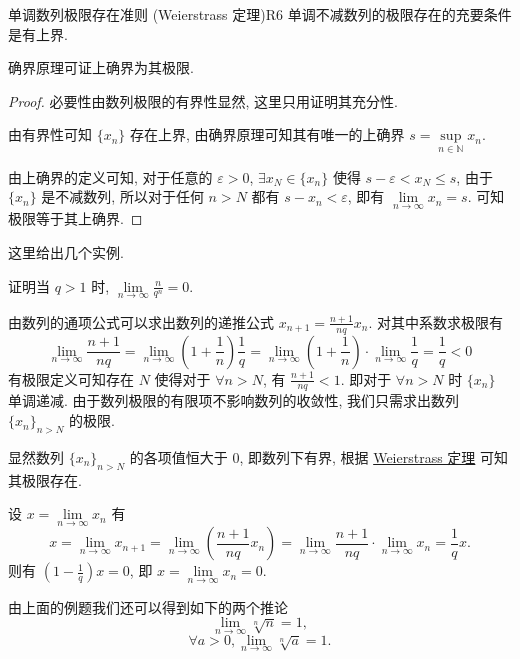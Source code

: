 \documentclass[cn,toc=twocol]{elegantbook}
\newcommand{\N}{\mathbb{N}}
\begin{document}
\begin{theorem}{单调数列极限存在准则 (Weierstrass 定理)}{R6}
单调不减数列的极限存在的充要条件是有上界.	
\end{theorem}

\begin{idea*}
	确界原理可证上确界为其极限.
\end{idea*}

\begin{proof}
	必要性由数列极限的有界性显然, 这里只用证明其充分性.
	
	由有界性可知 $\{x_n\}$ 存在上界, 由确界原理可知其有唯一的上确界 $s = \sup\limits_{n\in\N} x_n$.
	
	由上确界的定义可知, 对于任意的 $\varepsilon > 0$, $\exists x_N \in \{x_n\}$ 使得 $s - \varepsilon < x_N \le s$, 由于 $\{x_n\}$ 是不减数列, 所以对于任何 $n > N$ 都有 $s - x_n < \varepsilon$, 即有 $\lim\limits_{n \to \infty} x_n = s$. 可知极限等于其上确界.
\end{proof}
\smallskip

这里给出几个实例.

\begin{example}
	证明当 $q > 1$ 时, $\lim\limits_{n \to \infty} \frac{n}{q^n} = 0$. 
\end{example}

\begin{solution}
	由数列的通项公式可以求出数列的递推公式 $x_{n+1} = \frac{n+1}{nq} x_n$. 对其中系数求极限有
	\[
		\lim_{n \to \infty} \frac{n+1}{nq} = \lim_{n\to \infty} \left(1 + \frac{1}{n}\right)\frac{1}{q} = \lim_{n\to \infty} \left(1 + \frac{1}{n}\right) \cdot \lim_{n\to \infty} \frac{1}{q} = \frac{1}{q} < 0
	\]
	有极限定义可知存在 $N$ 使得对于 $\forall n > N$, 有 $\frac{n+1}{nq} < 1$. 即对于 $\forall n > N$ 时 $\{x_n\}$ 单调递减. 由于数列极限的有限项不影响数列的收敛性, 我们只需求出数列 $\{x_n\}_{n > N}$ 的极限.
	
	显然数列 $\{ x_n \}_{n > N}$ 的各项值恒大于 $0$, 即数列下有界, 根据 \hyperref[thm:R6]{Weierstrass 定理} 可知其极限存在.
	
	设 $x = \lim\limits_{n \to \infty} x_{n}$ 有
	\[
		x = \lim_{n \to \infty} x_{n + 1} = \lim_{n \to \infty}\left(\frac{n + 1}{nq} x_n\right) = \lim_{n \to \infty}\frac{n+1}{nq} \cdot \lim_{n \to \infty} x_n = \frac 1q x.
	\]
	则有 $(1 - \frac1q) x = 0$, 即 $x = \lim\limits_{n \to \infty} x_{n} = 0$.
\end{solution}
\smallskip

由上面的例题我们还可以得到如下的两个推论 
\[
	\lim_{n \to \infty} \sqrt[n]{n} = 1,
\]
\[
	\forall a > 0, \lim_{n \to \infty} \sqrt[n]{a} = 1.
\]
\smallskip
\end{document}
